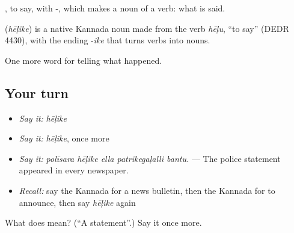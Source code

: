 , to say, with -, which makes a noun of a verb: what is said.

\begin{cousinweb}
\textbf{} (\emph{hēḷike}) is a native Kannada noun made from the verb \emph{hēḷu}, \textquotedblleft{}to say\textquotedblright{} (DEDR 4430), with the ending -\emph{ike} that turns verbs into nouns.
\end{cousinweb}

\begin{grammarlens}[title={What you've built}]
One more word for telling what happened.
\end{grammarlens}

\subsection*{Your turn}
\begin{itemize}
\raggedright
  \item \emph{Say it:} \emph{hēḷike}
  \item \emph{Say it:} \emph{hēḷike}, once more
  \item \emph{Say it:} \emph{polīsara hēḷike ella patrikegaḷalli bantu.} — The police statement appeared in every newspaper.
  \item \emph{Recall:} say the Kannada for a news bulletin, then the Kannada for to announce, then say \emph{hēḷike} again
\end{itemize}

\begin{tcolorbox}[breakable,colback=teal!4,colframe=teal!35!black,title={Before you move on}]
What does  mean? (\textquotedblleft{}A statement\textquotedblright{}.) Say it once more.
\end{tcolorbox}
